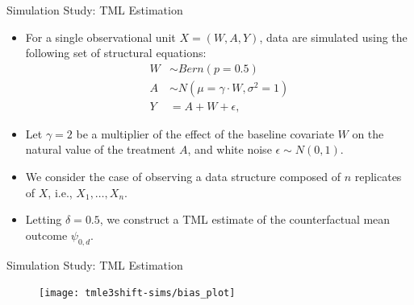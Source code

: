 \documentclass{beamer}
\begin{document}
\begin{frame}[c]{Simulation Study: TML Estimation}

\begin{center}
\begin{itemize}
  \itemsep6pt
  \item For a single observational unit $X = (W, A, Y)$, data are simulated
    using the following set of structural equations:
    \begin{align*}
      W & \sim Bern(p = 0.5)\\
      A & \sim N(\mu = \gamma \cdot W, \sigma^2 = 1)\\
      Y & = A + W + \epsilon,
     \end{align*}
   \item Let $\gamma = 2$ be a multiplier of the effect of the baseline
     covariate $W$ on the natural value of the treatment $A$, and white noise
     $\epsilon \sim N(0, 1)$.
   \item We consider the case of observing a data structure composed of $n$
     replicates of $X$, i.e., $X_1, \ldots, X_n$.
   \item Letting $\delta = 0.5$, we construct a TML estimate of the
     counterfactual mean outcome $\psi_{0, d}$.
\end{itemize}
\end{center}


\end{frame}


\begin{frame}[c]{Simulation Study: TML Estimation}

\vspace{-0.45em}
\begin{figure}\label{fig:tmle3shift-bias}
  \centering
  \texttt{[image: tmle3shift-sims/bias\_plot]}
\end{figure}

\note{
}

\end{frame}

\end{document}
